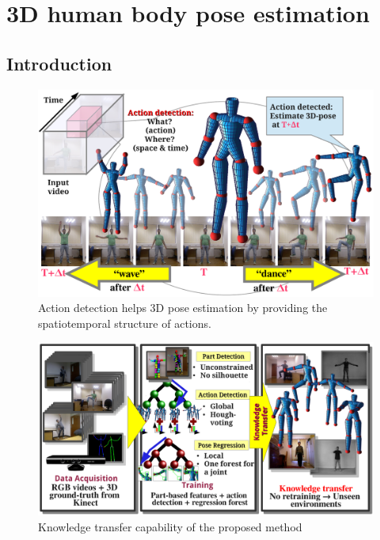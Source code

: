 \chapter{3D human body pose estimation}
\label{chap/body}

\section{Introduction}
\label{sec/body/intro}

\begin{figure}[ht]
	\centering
	\includegraphics[width=1\linewidth]{fig/body/figure1_actionexplain.pdf} 
	\caption{Action detection helps 3D pose estimation by providing the spatiotemporal structure of actions.} 
	\label{fig/body/actionexplain}
\end{figure}

\begin{figure}[ht]
	\centering
	\includegraphics[width=1\linewidth]{fig/body/figure2_transferexplain.pdf}
	\caption{Knowledge transfer capability of the proposed method} 
	\label{fig/body/transferexplain}
\end{figure}

